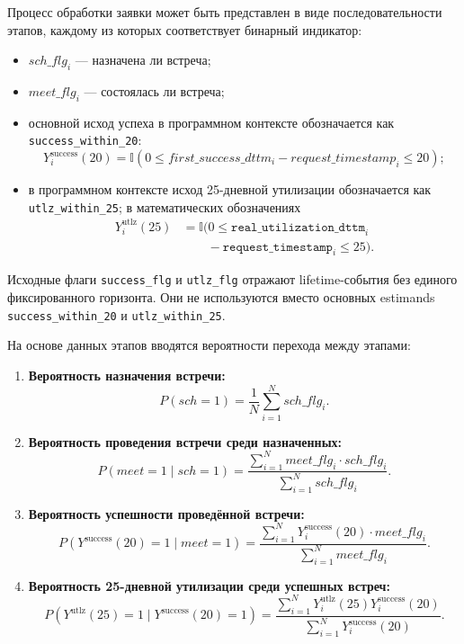 \documentclass[14pt,a4paper]{extarticle}
\begin{document}
Процесс обработки заявки может быть представлен в виде последовательности этапов, каждому из которых соответствует бинарный индикатор:
\begin{itemize}
    \item \(sch\_flg_i\) --- назначена ли встреча;
    \item \(meet\_flg_i\) --- состоялась ли встреча;
    \item основной исход успеха в программном контексте обозначается как \texttt{success\_within\_20}:
    \[
    Y_i^{\mathrm{success}}(20)=
    \mathbb{I}\!\left(0\leq first\_success\_dttm_i-request\_timestamp_i\leq20\right);
    \]
    \item в программном контексте исход 25-дневной утилизации обозначается как \texttt{utlz\_within\_25}; в математических обозначениях
    \[
    \begin{aligned}
    Y_i^{\mathrm{utlz}}(25)
    &=
    \mathbb{I}
    \bigl(
    0 \leq
    \texttt{real\_utilization\_dttm}_i
    \\
    &\qquad
    -
    \texttt{request\_timestamp}_i
    \leq 25
    \bigr).
    \end{aligned}
    \]
\end{itemize}

Исходные флаги \texttt{success\_flg} и \texttt{utlz\_flg} отражают lifetime-события без единого фиксированного горизонта. Они не используются вместо основных estimands \texttt{success\_within\_20} и \texttt{utlz\_within\_25}.

На основе данных этапов вводятся вероятности перехода между этапами:
\begin{enumerate}
    \item \textbf{Вероятность назначения встречи:}
    \[
    P(sch=1) = \frac{1}{N}\sum_{i=1}^N sch\_flg_i.
    \]
    \item \textbf{Вероятность проведения встречи среди назначенных:}
    \[
    P(meet=1\mid sch=1) = \frac{\sum_{i=1}^N meet\_flg_i \cdot sch\_flg_i}{\sum_{i=1}^N sch\_flg_i}.
    \]
    \item \textbf{Вероятность успешности проведённой встречи:}
    \[
    P(Y^{\mathrm{success}}(20)=1\mid meet=1) =
    \frac{\sum_{i=1}^N Y_i^{\mathrm{success}}(20) \cdot meet\_flg_i}{\sum_{i=1}^N meet\_flg_i}.
    \]
    \item \textbf{Вероятность 25-дневной утилизации среди успешных встреч:}
    \[
    P\!\left(Y^{\mathrm{utlz}}(25)=1\mid Y^{\mathrm{success}}(20)=1\right)
    =
    \frac{\sum_{i=1}^N Y_i^{\mathrm{utlz}}(25)Y_i^{\mathrm{success}}(20)}
    {\sum_{i=1}^N Y_i^{\mathrm{success}}(20)}.
    \]
\end{enumerate}
\end{document}
